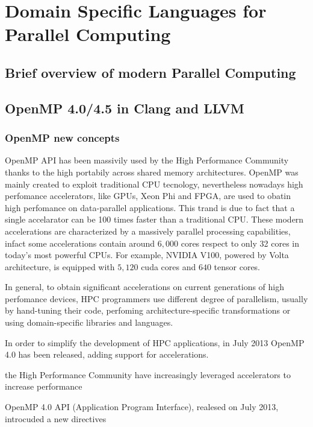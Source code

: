 \chapter{Domain Specific Languages for Parallel Computing}

\section{Brief overview of modern Parallel Computing}

\section{OpenMP 4.0/4.5 in Clang and LLVM}


\subsection{OpenMP new concepts}

OpenMP API has been massivily used by the High Performance Community thanks to the high portabily across shared memory architectures. OpenMP was mainly created to exploit traditional CPU tecnology, nevertheless nowadays high perfomance accelerators, like GPUs, Xeon Phi and FPGA, are used to obatin high perfomance on data-parallel applications. This trand is due to fact that a single accelarator can be 100 times faster than a traditional CPU. These modern accelerations are characterized by a massively parallel processing capabilities, infact some accelerations contain around $6,000$ cores respect to only 32 cores in today’s most powerful CPUs. For example, NVIDIA V100, powered by Volta architecture, is equipped with $5,120$ cuda cores and $640$ tensor cores. 

In general, to obtain significant accelerations on current generations of high perfomance devices, HPC programmers use different degree of parallelism, usually by hand-tuning their code, perfoming architecture-specific transformations or using domain-specific libraries and languages.

In order to simplify the development of HPC applications, in July 2013 OpenMP 4.0 has been released, adding support for accelerations. 




the High Performance Community have increasingly leveraged accelerators to increase performance   

OpenMP 4.0 API (Application Program Interface), realesed on July 2013, introcuded a new directives


